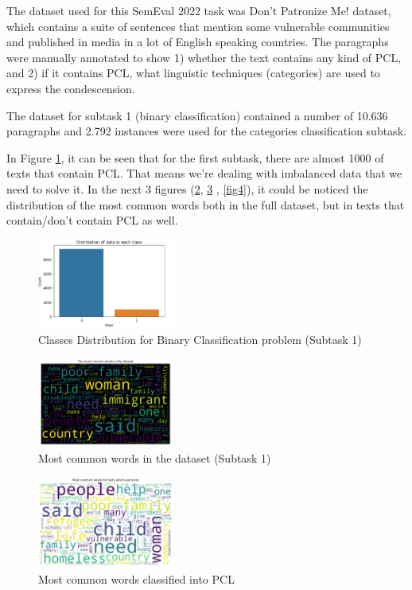 \documentclass[11pt]{article}
\begin{document}
The dataset used for this SemEval 2022 task was Don't Patronize Me! dataset,
which contains a suite of sentences that mention some vulnerable communities
and published in media in a lot of English speaking countries. The
paragraphs were manually annotated to show 1) whether the text contains any
kind of PCL, and 2) if it contains PCL, what linguistic techniques
(categories) are used to express the condescension.

The dataset for subtask 1 (binary classification) contained a number of
10.636 paragraphs and 2.792 instances were used for the categories
classification subtask.

In Figure \ref{fig1}, it can be seen that for the first subtask, there are almost
1000 of texts that contain PCL. That means we're dealing with imbalanced
data that we need to solve it. In the next 3 figures (\ref{fig2}, \ref{fig3}
, \ref{fig4}), it could be noticed the distribution of the most common words
both in the full dataset, but in texts that contain/don't contain PCL as
well.

\begin{figure}[ht]
	\centering
	\includegraphics[width=0.4\textwidth]{DataDistribution.png}
	\caption{Classes Distribution for Binary Classification problem (Subtask 1)}
	\label{fig1}
\end{figure}

\begin{figure}[ht]
	\centering
	\includegraphics[width=0.4\textwidth]{common.png}
	\caption{Most common words in the dataset (Subtask 1)}
	\label{fig2}
\end{figure}

\begin{figure}[ht]
	\centering
	\includegraphics[width=0.4\textwidth]{pcl.png}
	\caption{Most common words classified into PCL}
	\label{fig3}
\end{figure}
\end{document}
